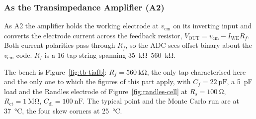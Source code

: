%
%
%

\subsubsection{As the Transimpedance Amplifier (A2)}\label{sss:ampab-tia}

As A2 the amplifier holds the working electrode at $v_{\mathrm{cm}}$ on its inverting
input and converts the electrode current across the feedback resistor,
\(V_{\mathrm{OUT}} = v_{\mathrm{cm}} - I_{\mathrm{WE}} R_f\). Both current polarities
pass through $R_f$, so the ADC sees offset binary about the $v_{\mathrm{cm}}$ code.
$R_f$ is a 16-tap string spanning \SIrange{35}{560}{\kilo\ohm}.

The bench is Figure~\ref{fig:tb-tiafb}: $R_f = \SI{560}{\kilo\ohm}$, the only tap
characterised here and the only one to which the figures of this part apply, with
$C_f = \SI{22}{\pico\farad}$, a \SI{5}{\pico\farad} load and the Randles electrode of
Figure~\ref{fig:randles-cell} at $R_s = \SI{100}{\ohm}$,
$R_{\mathrm{ct}} = \SI{1}{\mega\ohm}$, $C_{\mathrm{dl}} = \SI{100}{\nano\farad}$. The
typical point and the Monte Carlo run are at \SI{37}{\celsius}, the four skew corners at
\SI{25}{\celsius}.
